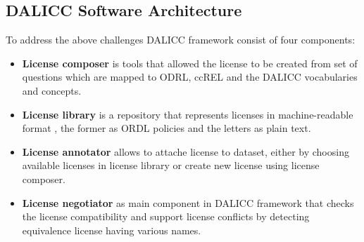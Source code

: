 \subsection{DALICC Software Architecture}
To address the above challenges DALICC framework consist of four components:\\
\begin{itemize}
	\item \textbf{License composer} is tools that allowed the license to be created from set of questions which are mapped to ODRL, ccREL and the DALICC vocabularies and concepts.
	\item \textbf{License library} is a repository that represents licenses in machine-readable format , the former as ORDL policies and the letters as plain text.
	\item \textbf{License annotator} allows to attache license to dataset, either by choosing available licenses in license library or create new license using license composer.
	\item \textbf{License negotiator} as main component in DALICC framework that checks the license compatibility and support license conflicts by detecting equivalence license having various names.
\end{itemize}
